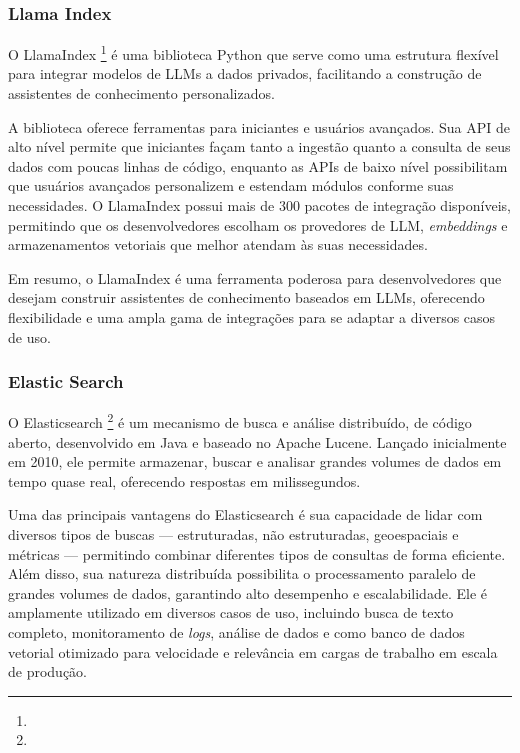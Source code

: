 \documentclass[a4paper, 12pt]{article}
\begin{document}
    \subsubsection{Llama Index} \label{sec:llama_index}

    O LlamaIndex \footnote{} é uma biblioteca Python que serve como uma estrutura flexível para integrar modelos de LLMs a dados privados, facilitando a construção de assistentes de conhecimento personalizados.

    A biblioteca oferece ferramentas para iniciantes e usuários avançados. Sua API de alto nível permite que iniciantes façam tanto a ingestão quanto a consulta de seus dados com poucas linhas de código, enquanto as APIs de baixo nível possibilitam que usuários avançados personalizem e estendam módulos conforme suas necessidades. O LlamaIndex possui mais de 300 pacotes de integração disponíveis, permitindo que os desenvolvedores escolham os provedores de LLM, \textit{embeddings} e armazenamentos vetoriais que melhor atendam às suas necessidades.

    Em resumo, o LlamaIndex é uma ferramenta poderosa para desenvolvedores que desejam construir assistentes de conhecimento baseados em LLMs, oferecendo flexibilidade e uma ampla gama de integrações para se adaptar a diversos casos de uso.

    \subsubsection{Elastic Search} \label{sec:elasticsearch}

    O Elasticsearch \footnote{} é um mecanismo de busca e análise distribuído, de código aberto, desenvolvido em Java e baseado no Apache Lucene. Lançado inicialmente em 2010, ele permite armazenar, buscar e analisar grandes volumes de dados em tempo quase real, oferecendo respostas em milissegundos.

    Uma das principais vantagens do Elasticsearch é sua capacidade de lidar com diversos tipos de buscas — estruturadas, não estruturadas, geoespaciais e métricas — permitindo combinar diferentes tipos de consultas de forma eficiente. Além disso, sua natureza distribuída possibilita o processamento paralelo de grandes volumes de dados, garantindo alto desempenho e escalabilidade. Ele é amplamente utilizado em diversos casos de uso, incluindo busca de texto completo, monitoramento de \textit{logs}, análise de dados e como banco de dados vetorial otimizado para velocidade e relevância em cargas de trabalho em escala de produção.
\end{document}
